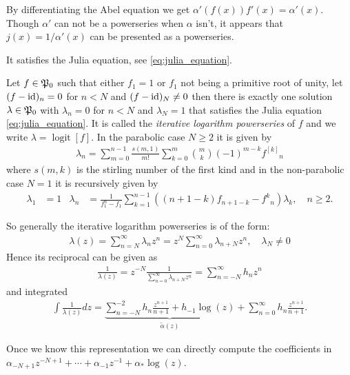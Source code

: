 \documentclass{article}
\numberwithin{equation}{section}
\begin{document}
By differentiating the Abel equation we get
$\alpha'(f(x))f'(x)=\alpha'(x)$. Though $\alpha'$ can not be a
powerseries when $\alpha$ isn't, it appears that
$j(x)=1/\alpha'(x)$ can be presented as a powerseries.

It satisfies the Julia equation, see \eqref{eq:julia_equation}.
\newcommand{\logit}{\operatorname{logit}}
\begin{wellknown}
  Let $f\in \mathfrak{P}_0$ such that either $f_1=1$ or $f_1$ not being a
  primitive root of unity, let $(f-\operatorname{id})_n=0$ for $n<N$ and
  $(f-\operatorname{id})_N\neq 0$ 
  then there is exactly one solution
  $\lambda\in\mathfrak{P}_0$ with $\lambda_n=0$ for $n<N$ and $\lambda_N=1$
  that satisfies the Julia equation \eqref{eq:julia_equation}.
  It is called the {\em iterative
    logarithm powerseries} of $f$ and we write $\lambda=\logit[f]$. 
  In the parabolic case $N\ge 2$ it is given by
  \begin{gather}
    \lambda_{n} = \sum_{m=0}^{n-1} \frac{s(m,1)}{m!}\sum_{k=0}^m
    \binom{m}{k} (-1)^{m-k} {f^{[k]}}_n
  \end{gather}
  where $s(m,k)$ is the stirling number of the first kind and in the
  non-parabolic case $N=1$ it is recursively given by
  \begin{align}
    \lambda_1 &= 1 &
    \lambda_n &= \frac{1}{f_1^n-f_1}\sum_{k=1}^{n-1}
    ((n+1-k)f_{n+1-k}-{f^k}_n) \lambda_{k},\quad n\ge 2.
  \end{align}
\end{wellknown}

So generally the iterative logarithm powerseries is of the form:
\begin{align}
  \label{eq:julia_form}
  \lambda(z) = \sum_{n=N}^\infty \lambda_n z^n 
  = z^N\sum_{n=0}^\infty \lambda_{n+N} z^n,\quad \lambda_N\neq 0
\end{align}
Hence its reciprocal can be given as
\begin{align}
  \frac{1}{\lambda(z)} = z^{-N}\frac{1}{\sum_{n=0}^\infty
    \lambda_{n+N} z^n} = \sum_{n=-N}^\infty h_n z^n
\end{align}
and integrated
\begin{align}\label{eq:Abel_Julia}
\int \frac{1}{\lambda(z)} dz = 
\underbrace{\sum_{n=-N}^{-2} h_n\frac{z^{n+1}}{n+1} + h_{-1}
  \log(z)}_{\tilde{\alpha}(z)} + \sum_{n=0}^\infty h_n\frac{z^{n+1}}{n+1} .
\end{align}

Once we know this representation we can directly compute the
coefficients in $\alpha_{-N+1}z^{-N+1} + \dotsb +
\alpha_{-1}z^{-1} + \alpha_\ast \log(z)$.
\end{document}
